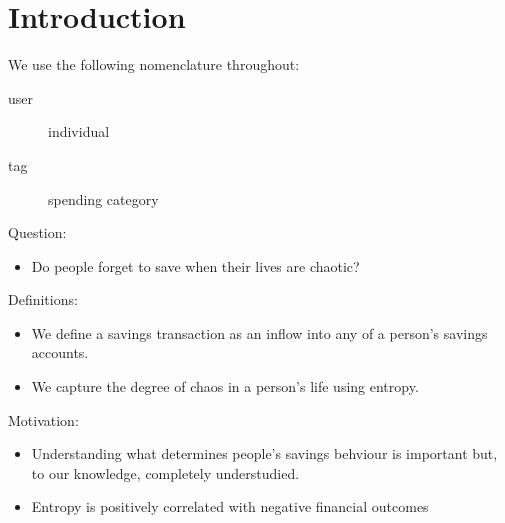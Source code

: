 
\section{Introduction}%
\label{sec:introduction}

We use the following nomenclature throughout:
\begin{description}
    \item[user] individual
    \item[tag] spending category
\end{description}




Question:
\begin{itemize}
    \item Do people forget to save when their lives are chaotic?
\end{itemize}

Definitions:
\begin{itemize}
    \item We define a savings transaction as an inflow into any of a person's
        savings accounts.
    \item We capture the degree of chaos in a person's life using entropy.
\end{itemize}


Motivation:
\begin{itemize}
    \item Understanding what determines people's savings behviour is important
        but, to our knowledge, completely understudied.

    \item Entropy is positively correlated with negative financial outcomes
        \citet{muggleton2020evidence}
\end{itemize}







